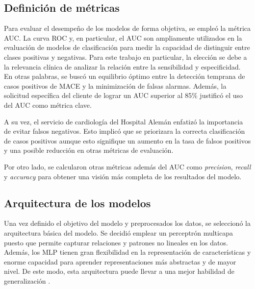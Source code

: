 \subsection{Definición de métricas}

Para evaluar el desempeño de los modelos de forma objetiva, se empleó la métrica AUC. La curva ROC y, 
en particular, el AUC son ampliamente utilizados en la evaluación de modelos de clasificación para 
medir la capacidad de distinguir entre clases positivas y negativas. Para este trabajo en particular, 
la elección se debe a la relevancia clínica de analizar la relación entre la sensibilidad y especificidad. 
En otras palabras, se buscó un equilibrio óptimo entre la detección temprana de casos positivos de MACE 
y la minimización de falsas alarmas. Además, la solicitud específica del cliente de lograr un AUC superior 
al 85\% justificó el uso del AUC como métrica clave. 

A su vez, el servicio de cardiología del Hospital Alemán enfatizó la importancia de evitar falsos negativos. 
Esto implicó que se priorizara la correcta clasificación de casos positivos aunque esto signifique un aumento 
en la tasa de falsos positivos y una posible reducción en otras métricas de evaluación. 

Por otro lado, se calcularon otras métricas además del AUC como \emph{precision}, \emph{recall} y \emph{accuracy} 
para obtener una visión más completa de los resultados del modelo.


\subsection{Arquitectura de los modelos}
\label{sec:arquitectura}
Una vez definido el objetivo del modelo y preprocesados los datos, se seleccionó la arquitectura básica del modelo. 
Se decidió emplear un perceptrón multicapa puesto que permite capturar relaciones y patrones no lineales en los 
datos. Además, los MLP tienen gran flexibilidad en la representación de características y enorme capacidad para 
aprender representaciones más abstractas y de mayor nivel. De este modo, esta arquitectura puede llevar a una 
mejor habilidad de generalización \citep{CITE:35} \citep{CITE:44}. 

